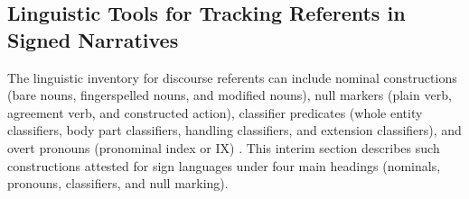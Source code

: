 \documentclass[review]{elsarticle} %
\begin{document}
\hypertarget{linguistic-tools-for-tracking-referents-in-signed-narratives}{%
\subsection{Linguistic Tools for Tracking Referents in Signed
Narratives}\label{linguistic-tools-for-tracking-referents-in-signed-narratives}}

The linguistic inventory for discourse referents can include nominal
constructions (bare nouns, fingerspelled nouns, and modified nouns),
null markers (plain verb, agreement verb, and constructed action),
classifier predicates (whole entity classifiers, body part classifiers,
handling classifiers, and extension classifiers), and overt pronouns
(pronominal index or IX) \citep{frederiksen2016}. This interim section
describes such constructions attested for sign languages under four main
headings (nominals, pronouns, classifiers, and null marking).

\clearpage
\end{document}
